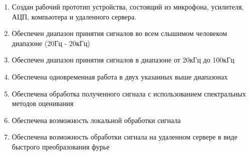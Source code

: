\documentclass[../paper.tex]{subfiles}
\begin{document}
\begin{enumerate}
  \item Создан рабочий прототип устройства, состоящий из микрофона, усилителя, АЦП, компьютера и удаленного сервера.
  \item Обеспечен диапазон принятия сигналов во всем слышимом человеком диапазоне (20Гц - 20кГц)
  \item Обеспечен диапазон принятия сигналов в диапазоне от 20кГц до 100кГц
  \item Обеспечена одновременная работа в двух указанных выше диапазонах
  \item Обеспечена обработка полученного сигнала с использованием спектральных методов оценивания
  \item Обеспечена возможность локальной обработки сигнала
  \item Обеспечена возможность обработки сигнала на удаленном сервере в виде быстрого преобразования фурье
\end{enumerate}
\end{document}
